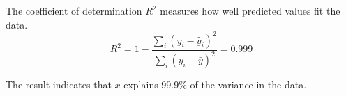 The coefficient of determination $R^2$ measures how well predicted values fit the data.
\begin{equation*}
R^2=1-\frac{\sum_i(y_i-\hat y_i)^2}{\sum_i(y_i-\bar y)^2}=0.999
\end{equation*}

The result indicates that $x$ explains 99.9\%
of the variance in the data.


